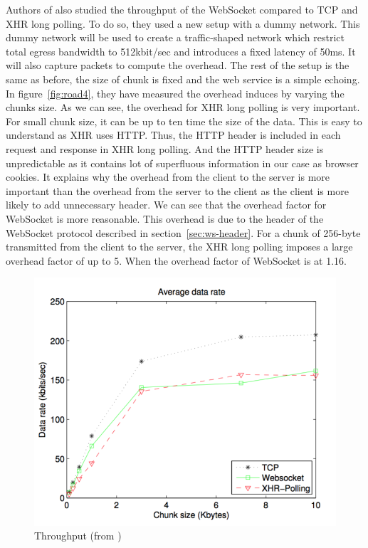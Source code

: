 \documentclass[10pt,journal,compsoc]{IEEEtran}
\newcommand{\ws}{WebSocket}
\begin{document}
Authors of \cite{roadblock} also studied the throughput of the \ws{} compared to TCP and XHR long polling.
To do so, they used a new setup with a dummy network.
This dummy network will be used to create a traffic-shaped network which restrict total egress bandwidth to 512kbit/sec and introduces a fixed latency of 50ms.
It will also capture packets to compute the overhead.
The rest of the setup is the same as before, the size of chunk is fixed and the web service is a simple echoing.
In figure~\ref{fig:road4}, they have measured the overhead induces by varying the chunks size.
As we can see, the overhead for XHR long polling is very important.
For small chunk size, it can be up to ten time the size of the data.
This is easy to understand as XHR uses HTTP.
Thus, the HTTP header is included in each request and response in XHR long polling.
And the HTTP header size is unpredictable as it contains lot of superfluous information in our case as browser cookies.
It explains why the overhead from the client to the server is more important than the overhead from the server to the client as the client is more likely to add unnecessary header.
We can see that the overhead factor for \ws{} is more reasonable.
This overhead is due to the header of the \ws{} protocol described in section~\ref{sec:ws-header}.
For a chunk of 256-byte transmitted from the client to the server, the XHR long polling imposes a large overhead factor of up to 5.
When the overhead factor of \ws{} is at 1.16.


\begin{figure}[!ht]
    \centering
    \includegraphics[width=\linewidth]{road3.png}
    \caption{Throughput (from \cite{roadblock})}
    \label{fig:road3}
\end{figure}
\end{document}
